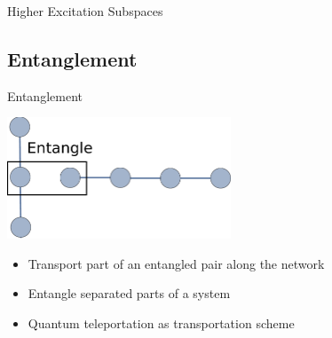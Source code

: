 \documentclass{beamer}
\begin{document}
\begin{frame}{Higher Excitation Subspaces}
\end{frame}

\subsection{Entanglement}
\begin{frame}{Entanglement}
	\begin{center}
		\includegraphics[trim=0mm 0 0 0mm, width=0.5\textwidth]{Images/entanglement}
	\end{center}
	\begin{itemize}
		\item Transport part of an entangled pair along the network
		\item Entangle separated parts of a system
		\item Quantum teleportation as transportation scheme
	\end{itemize}
\end{frame}
\end{document}
